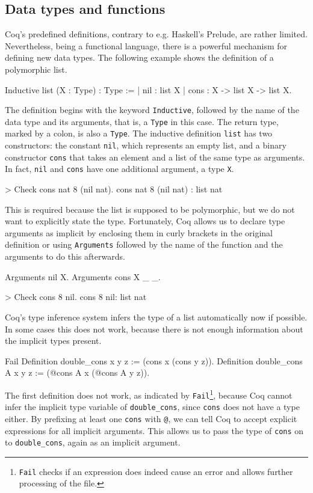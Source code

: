\documentclass[paper = a4, fleqn, abstract=on, twoside]{scrreprt}
\newcommand{\coqinline}[1]{\texttt{#1}}
\begin{document}
\subsection{Data types and functions}
Coq's predefined definitions, contrary to e.g. Haskell's Prelude, are rather limited. Nevertheless, being a functional language, there is a powerful mechanism for defining new data types. The following example shows the definition of a polymorphic list.
\begin{coqcode}
Inductive list (X : Type) : Type :=
  | nil  : list X
  | cons : X -> list X -> list X.
\end{coqcode}
The definition begins with the keyword \coqinline{Inductive}, followed by the name of the data type and its arguments, that is, a \coqinline{Type} in this case. The return type, marked by a colon, is also a \coqinline{Type}. The inductive definition \coqinline{list} has two constructors: the constant \coqinline{nil}, which represents an empty list, and a binary constructor \coqinline{cons} that takes an element and a list of the same type as arguments. In fact, \coqinline{nil} and \coqinline{cons} have one additional argument, a type \coqinline{X}. 
\begin{coqcode}
> Check cons nat 8 (nil nat).
cons nat 8 (nil nat) : list nat
\end{coqcode}
This is required because the list is supposed to be polymorphic, but we do not want to explicitly state the type. Fortunately, Coq allows us to declare type arguments as implicit by enclosing them in curly brackets in the original definition or using \coqinline{Arguments} followed by the name of the function and the arguments to do this afterwards.
\begin{coqcode}
Arguments nil {X}.
Arguments cons {X} _ _.

> Check cons 8 nil.
cons 8 nil: list nat
\end{coqcode}
Coq's type inference system infers the type of a list automatically now if possible. In some cases this does not work, because there is not enough information about the implicit types present. 
\begin{coqcode}
Fail Definition double_cons x y z := (cons x (cons y z)).
Definition double_cons {A} x y z := (@cons A x (@cons A y z)).
\end{coqcode}
The first definition does not work, as indicated by \coqinline{Fail}\footnote{\coqinline{Fail} checks if an expression does indeed cause an error and allows further processing of the file.}, because Coq cannot infer the implicit type variable of \coqinline{double_cons}, since \coqinline{cons} does not have a type either. By prefixing at least one \coqinline{cons} with \coqinline{@}, we can tell Coq to accept explicit expressions for all implicit arguments. This allows us to pass the type of \coqinline{cons} on to \coqinline{double_cons}, again as an implicit argument.
\end{document}
